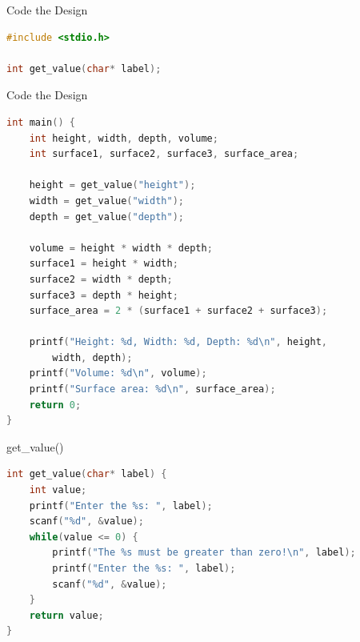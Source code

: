 \documentclass[graphics]{beamer}
\begin{document}
\begin{frame}[fragile]{Code the Design}
    \begin{lstlisting}[language=C,basicstyle=\footnotesize,keywordstyle=\color{blue},commentstyle=\color{green},showstringspaces=false,stringstyle=\color{red}]
#include <stdio.h>

int get_value(char* label);
    \end{lstlisting}
\end{frame}

\begin{frame}[fragile]{Code the Design}
    \begin{lstlisting}[language=C,basicstyle=\footnotesize,keywordstyle=\color{blue},commentstyle=\color{green},showstringspaces=false,stringstyle=\color{red}]
int main() {
    int height, width, depth, volume;
    int surface1, surface2, surface3, surface_area;
    
    height = get_value("height");
    width = get_value("width");
    depth = get_value("depth");
    
    volume = height * width * depth;
    surface1 = height * width;
    surface2 = width * depth;
    surface3 = depth * height;
    surface_area = 2 * (surface1 + surface2 + surface3);
    
    printf("Height: %d, Width: %d, Depth: %d\n", height,
        width, depth);
    printf("Volume: %d\n", volume);
    printf("Surface area: %d\n", surface_area);
    return 0;
}
    \end{lstlisting}
\end{frame}

\begin{frame}[fragile]{get\_value()}
    \begin{lstlisting}[language=C,basicstyle=\footnotesize,keywordstyle=\color{blue},commentstyle=\color{green},showstringspaces=false,stringstyle=\color{red}]
int get_value(char* label) {
    int value;
    printf("Enter the %s: ", label);
    scanf("%d", &value);
    while(value <= 0) {
        printf("The %s must be greater than zero!\n", label);
        printf("Enter the %s: ", label);
        scanf("%d", &value);
    }
    return value;
}
    \end{lstlisting}
\end{frame}
\end{document}
